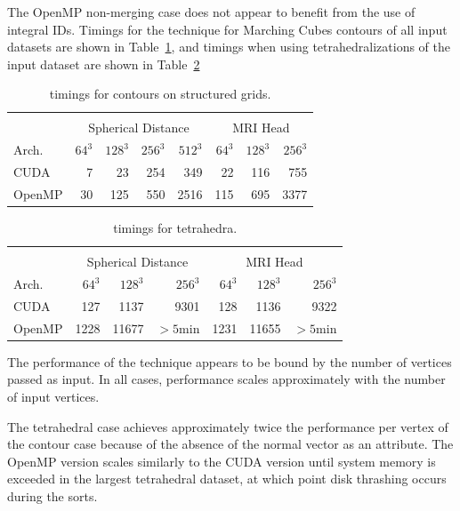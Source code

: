 \documentclass[10pt,journal,cspaper,compsoc]{IEEEtran}
\begin{document}
The OpenMP non-merging case does not appear to benefit from the use of integral IDs. Timings for the  technique for Marching Cubes contours of all input datasets are shown in Table~\ref{tab:vertexwelding}, and timings when using tetrahedralizations of the input dataset are shown in Table~\ref{tab:vertexweldingtetrahedra}

\begin{table}[tb!]
\begin{center}
\caption{ timings for contours on structured grids.}
\label{tab:vertexwelding}
\begin{tabular}{l|r r r r|r r r}
\multicolumn{8}{c}{ } \\
 & \multicolumn{4}{|c|}{Spherical Distance} & \multicolumn{3}{|c}{MRI Head}\\
Arch. & $64^3$ & $128^3$ & $256^3$ & $512^3$ & $64^3$ & $128^3$ & $256^3$\\
\hline
CUDA & 7 & 23 & 254 & 349 & 22 & 116 & 755 \\
OpenMP & 30 & 125 & 550 & 2516 & 115 & 695 & 3377 \\
\end{tabular}
\end{center}
\end{table}

\begin{table}[tb!]
\begin{center}
\caption{ timings for tetrahedra.}
\label{tab:vertexweldingtetrahedra}
\begin{tabular}{l|r r r|r r r}
\multicolumn{7}{c}{ } \\
 & \multicolumn{3}{|c|}{Spherical Distance} & \multicolumn{3}{|c}{MRI Head}\\
Arch. & $64^3$ & $128^3$ & $256^3$ & $64^3$ & $128^3$ & $256^3$\\
\hline
CUDA & 127 & 1137 & 9301 & 128 & 1136 & 9322 \\
OpenMP & 1228 & 11677 & $>5$min & 1231 & 11655 & $>5$min \\
\end{tabular}
\end{center}
\end{table}

The performance of the technique appears to be bound by the number of vertices passed as input. In all cases, performance scales approximately with the number of input vertices. 

The tetrahedral case achieves approximately twice the performance per vertex of the contour case because of the absence of the normal vector as an attribute. The OpenMP version scales similarly to the CUDA version until system memory is exceeded in the largest tetrahedral dataset, at which point disk thrashing occurs during the sorts.
\end{document}
